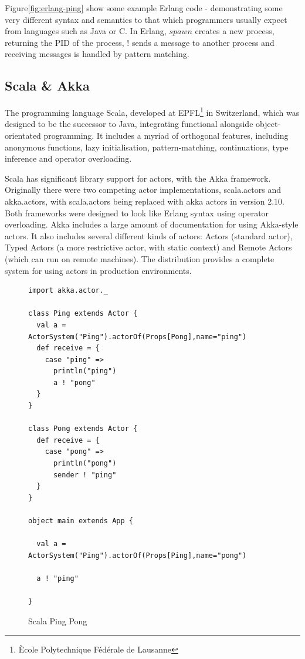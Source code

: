\documentclass[11pt,a4paper]{report}
\begin{document}
Figure\ref{fig:erlang-ping} show some example Erlang code - demonstrating some very different syntax and semantics to that which programmers usually expect from languages such as Java or C.
In Erlang, $spawn$ creates a new process, returning the PID of the process, $!$ sends a message to another process and receiving messages is handled by pattern matching.

\subsection{Scala \& Akka}

The programming language Scala, developed at EPFL\footnote{\`{E}cole Polytechnique F\'{e}d\'{e}rale de Lausanne} in Switzerland, which was designed to be the successor to Java, integrating functional alongside object-orientated programming.
It includes a myriad of orthogonal features, including anonymous functions, lazy initialisation, pattern-matching, continuations, type inference and operator overloading.

Scala has significant library support for actors, with the Akka framework.
Originally there were two competing actor implementations, scala.actors and akka.actors, with scala.actors being replaced with akka actors in version 2.10\cite{scala-actor-migration}.
Both frameworks were designed to look like Erlang syntax using operator overloading.
Akka includes a large amount of documentation for using Akka-style actors.
It also includes several different kinds of actors: Actors (standard actor), Typed Actors (a more restrictive actor, with static context) and Remote Actors (which can run on remote machines).
The distribution provides a complete system for using actors in production environments.

\begin{figure}[H]
\begin{verbatim}
import akka.actor._

class Ping extends Actor {
  val a = ActorSystem("Ping").actorOf(Props[Pong],name="ping")
  def receive = {
    case "ping" =>
      println("ping")
      a ! "pong"
  }
}

class Pong extends Actor {
  def receive = {
    case "pong" =>
      println("pong")
      sender ! "ping"
  }
}

object main extends App {

  val a = ActorSystem("Ping").actorOf(Props[Ping],name="pong")

  a ! "ping"

}
\end{verbatim}
\caption{Scala Ping Pong}
\label{fig:scala-ping-pong}
\end{figure}
\end{document}
